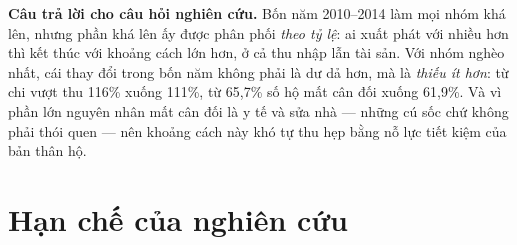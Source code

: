 \documentclass[11pt,a4paper]{article}
\begin{document}
\begin{tcolorbox}[colback=tintC, colframe=tintC, boxrule=0pt, arc=5pt, left=12pt, right=12pt, top=9pt, bottom=9pt]
\textbf{Câu trả lời cho câu hỏi nghiên cứu.} Bốn năm 2010–2014 làm mọi nhóm khá lên, nhưng phần khá lên ấy được phân phối \emph{theo tỷ lệ}: ai xuất phát với nhiều hơn thì kết thúc với khoảng cách lớn hơn, ở cả thu nhập lẫn tài sản. Với nhóm nghèo nhất, cái thay đổi trong bốn năm không phải là dư dả hơn, mà là \emph{thiếu ít hơn}: từ chi vượt thu 116\% xuống 111\%, từ 65,7\% số hộ mất cân đối xuống 61,9\%. Và vì phần lớn nguyên nhân mất cân đối là y tế và sửa nhà — những cú sốc chứ không phải thói quen — nên khoảng cách này khó tự thu hẹp bằng nỗ lực tiết kiệm của bản thân hộ.
\end{tcolorbox}

\section{Hạn chế của nghiên cứu}
\end{document}

